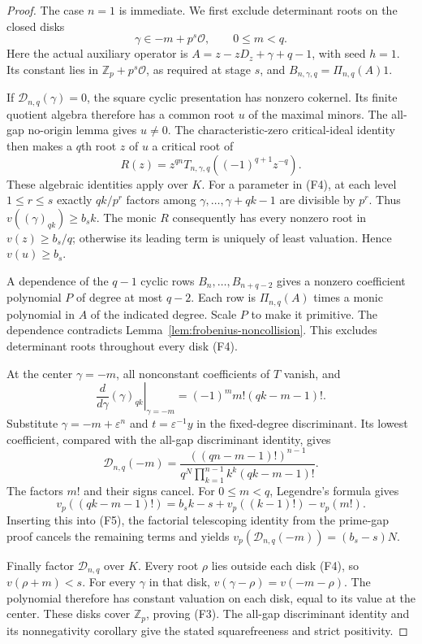 \documentclass[11pt]{article}
\begin{document}
\begin{proof}
The case $n=1$ is immediate. We first exclude determinant roots
on the closed disks
\[
 \gamma\in -m+p^s\mathcal O,\qquad 0\le m<q.             \tag{F4}
\]
Here the actual auxiliary operator is
$A=z-zD_z+\gamma+q-1$, with seed $h=1$.
Its constant lies in $\mathbb Z_p+p^s\mathcal O$, as required
at stage $s$, and $B_{n,\gamma,q}=\Pi_{n,q}(A)1$.

If $\mathcal D_{n,q}(\gamma)=0$, the square cyclic presentation
has nonzero cokernel. Its finite quotient algebra therefore has
a common root $u$ of the maximal minors.
The all-gap no-origin lemma gives $u\ne0$.
The characteristic-zero critical-ideal identity then makes a
$q$th root $z$ of $u$ a critical root of
\[
 R(z)=z^{qn}T_{n,\gamma,q}((-1)^{q+1}z^{-q}).
\]
These algebraic identities apply over $K$.
For a parameter in (F4), at each level $1\le r\le s$
exactly $qk/p^r$ factors among $\gamma,\ldots,\gamma+qk-1$
are divisible by $p^r$. Thus
$v((\gamma)_{qk})\ge b_sk$.
The monic $R$ consequently has every nonzero root in
$v(z)\ge b_s/q$; otherwise its leading term is uniquely of least
valuation. Hence $v(u)\ge b_s$.

A dependence of the $q-1$ cyclic rows
$B_n,\ldots,B_{n+q-2}$ gives a nonzero coefficient polynomial $P$
of degree at most $q-2$. Each row is $\Pi_{n,q}(A)$ times a
monic polynomial in $A$ of the indicated degree.
Scale $P$ to make it primitive.
The dependence contradicts Lemma~\ref{lem:frobenius-noncollision}.
This excludes determinant roots throughout every disk (F4).

At the center $\gamma=-m$, all nonconstant coefficients of $T$
vanish, and
\[
 \left.\frac{d}{d\gamma}(\gamma)_{qk}\right|_{\gamma=-m}
       =(-1)^m m!(qk-m-1)!.
\]
Substitute $\gamma=-m+\varepsilon^n$ and
$t=\varepsilon^{-1}y$ in the fixed-degree discriminant.
Its lowest coefficient, compared with the all-gap discriminant
identity, gives
\[
 \mathcal D_{n,q}(-m)=
 \frac{((qn-m-1)!)^{n-1}}
      {q^N\prod_{k=1}^{n-1}k^k(qk-m-1)!}.               \tag{F5}
\]
The factors $m!$ and their signs cancel.
For $0\le m<q$, Legendre's formula gives
\[
 v_p((qk-m-1)!)
       =b_sk-s+v_p((k-1)!)-v_p(m!).
\]
Inserting this into (F5), the factorial telescoping identity from
the prime-gap proof cancels the remaining terms and yields
$v_p(\mathcal D_{n,q}(-m))=(b_s-s)N$.

Finally factor $\mathcal D_{n,q}$ over $K$.
Every root $\rho$ lies outside each disk (F4), so
$v(\rho+m)<s$. For every $\gamma$ in that disk,
$v(\gamma-\rho)=v(-m-\rho)$.
The polynomial therefore has constant valuation on each disk,
equal to its value at the center. These disks cover
$\mathbb Z_p$, proving (F3).
The all-gap discriminant identity and its nonnegativity corollary
give the stated squarefreeness and strict positivity.
\end{proof}
\end{document}
